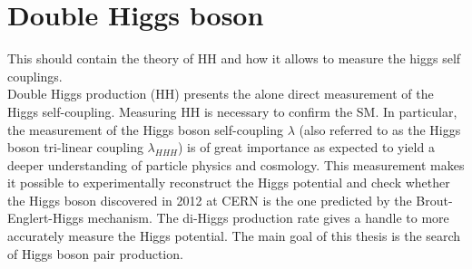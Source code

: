 \section{Double Higgs boson}
\label{chap1:HH}
This should contain the theory of HH and how it allows to measure the higgs self couplings.
\\
Double Higgs production (HH) presents the alone direct measurement of the Higgs self-coupling.  Measuring HH is necessary to confirm the SM. In particular, the measurement of the Higgs boson self-coupling $\lambda$ (also referred to as the Higgs boson tri-linear coupling $\lambda_{HHH}$) is of great importance as expected to yield a deeper understanding of particle physics and cosmology. This measurement makes it possible to experimentally reconstruct the Higgs potential and check whether the Higgs boson discovered in 2012 at CERN is the one predicted by the Brout-Englert-Higgs mechanism. The di-Higgs production rate gives a handle to more accurately measure the Higgs potential. The main goal of this thesis is the search of Higgs boson pair production.

